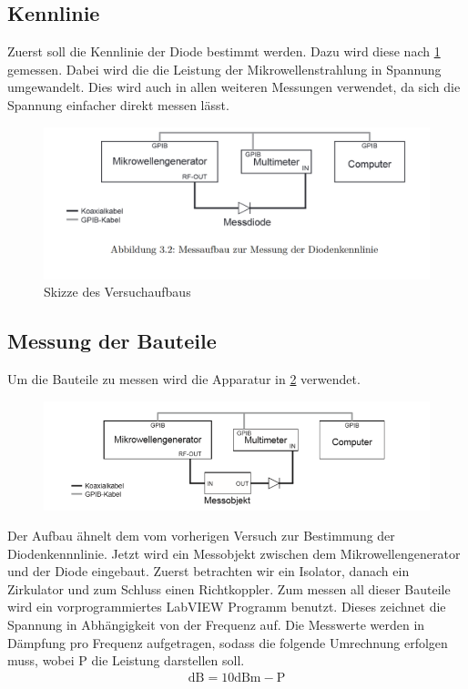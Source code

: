 \subsection{Kennlinie}
Zuerst soll die Kennlinie der Diode bestimmt werden. Dazu wird diese nach \cref{Aufbau} gemessen. Dabei wird die die Leistung der Mikrowellenstrahlung in Spannung umgewandelt. Dies wird auch in allen weiteren Messungen verwendet, da sich die Spannung einfacher direkt messen lässt.

\begin{figure}[h]
	\centering
	\includegraphics[scale=0.4]{Diode_Aufbau.PNG}
	\caption{Skizze des Versuchaufbaus}
	\label{Aufbau}
\end{figure}

\subsection{Messung der Bauteile}
Um die Bauteile zu messen wird die Apparatur in \cref{Mess} verwendet.
\begin{figure}[h!]
	\centering
	\includegraphics[scale = 1]{Mess.png}
	\caption{}
	\label{Mess}
\end{figure}
Der Aufbau ähnelt dem vom vorherigen Versuch zur Bestimmung der Diodenkennnlinie. Jetzt wird ein Messobjekt zwischen dem Mikrowellengenerator und der Diode eingebaut. Zuerst betrachten wir ein Isolator, danach ein Zirkulator und zum Schluss einen Richtkoppler. Zum messen all dieser Bauteile wird ein vorprogrammiertes LabVIEW Programm benutzt. Dieses zeichnet die Spannung in Abhängigkeit von der Frequenz auf. Die Messwerte werden in Dämpfung pro Frequenz aufgetragen, sodass die folgende Umrechnung erfolgen muss, wobei P die Leistung darstellen soll.
\begin{align}
	\text{dB} = 10\text{dBm} - \text{P}
	\label{F1}
\end{align}

